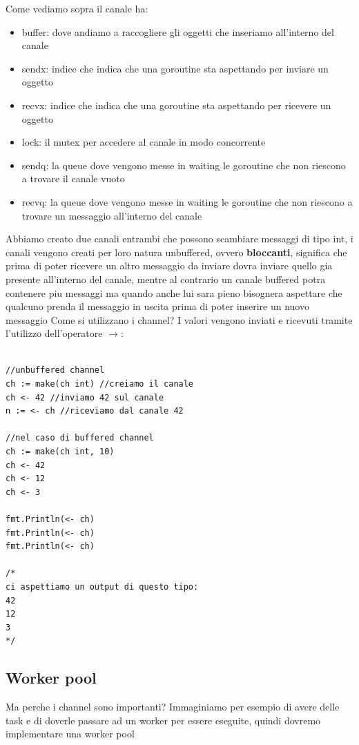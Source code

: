 Come vediamo sopra il canale ha: 
\begin{itemize}
    \item buffer: dove andiamo a raccogliere gli oggetti che inseriamo all'interno del canale
    \item sendx: indice che indica che una goroutine sta aspettando per inviare un oggetto
    \item recvx:
    indice che indica che una goroutine sta aspettando per ricevere un oggetto
    \item lock: il mutex per accedere al canale in modo concorrente
    \item sendq: la queue dove vengono messe in waiting le goroutine che non riescono a trovare il canale vuoto
    \item recvq: la queue dove vengono messe in waiting le goroutine che non riescono a trovare un messaggio all'interno del canale
\end{itemize}

\vspace{1cm}

Abbiamo creato due canali entrambi che possono scambiare messaggi di tipo int, i canali vengono creati per loro natura unbuffered, ovvero \textbf{bloccanti}, significa che prima di poter ricevere un altro messaggio da inviare dovra inviare quello gia presente all'interno del canale, mentre al contrario un canale buffered potra contenere piu messaggi ma quando anche lui sara pieno bisognera aspettare che qualcuno prenda il messaggio in uscita prima di poter inserire un nuovo messaggio \newline
Come si utilizzano i channel? I valori vengono inviati e ricevuti tramite l'utilizzo dell'operatore \textbf{$\rightarrow$}:

\begin{lstlisting}

//unbuffered channel
ch := make(ch int) //creiamo il canale
ch <- 42 //inviamo 42 sul canale
n := <- ch //riceviamo dal canale 42

//nel caso di buffered channel
ch := make(ch int, 10)
ch <- 42
ch <- 12
ch <- 3

fmt.Println(<- ch)
fmt.Println(<- ch)
fmt.Println(<- ch)

/*
ci aspettiamo un output di questo tipo:
42
12
3
*/

\end{lstlisting}

\subsection{Worker pool}
Ma perche i channel sono importanti? Immaginiamo per esempio di avere delle task e di doverle passare ad un worker per essere eseguite, quindi dovremo implementare una worker pool 

